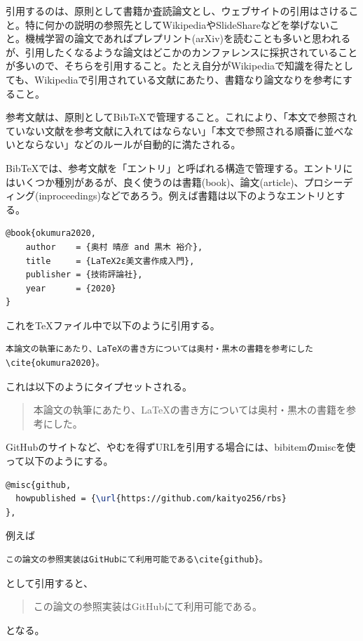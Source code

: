 \documentclass[titlepage]{jsreport}
\begin{document}
引用するのは、原則として書籍か査読論文とし、ウェブサイトの引用はさけること。特に何かの説明の参照先としてWikipediaやSlideShareなどを挙げないこと。機械学習の論文であればプレプリント(arXiv)を読むことも多いと思われるが、引用したくなるような論文はどこかのカンファレンスに採択されていることが多いので、そちらを引用すること。たとえ自分がWikipediaで知識を得たとしても、Wikipediaで引用されている文献にあたり、書籍なり論文なりを参考にすること。

参考文献は、原則としてBibTeXで管理すること。これにより、「本文で参照されていない文献を参考文献に入れてはならない」「本文で参照される順番に並べないとならない」などのルールが自動的に満たされる。

BibTeXでは、参考文献を「エントリ」と呼ばれる構造で管理する。エントリにはいくつか種別があるが、良く使うのは書籍(book)、論文(article)、プロシーディング(inproceedings)などであろう。例えば書籍は以下のようなエントリとする。

\begin{lstlisting}[language=TeX]
@book{okumura2020,
    author    = {奥村 晴彦 and 黒木 裕介},
    title     = {LaTeX2ε美文書作成入門},
    publisher = {技術評論社},
    year      = {2020}
}
\end{lstlisting}

これをTeXファイル中で以下のように引用する。

\begin{verbatim}
本論文の執筆にあたり、LaTeXの書き方については奥村・黒木の書籍を参考にした\cite{okumura2020}。
\end{verbatim}

これは以下のようにタイプセットされる。
\begin{quotation}
    本論文の執筆にあたり、LaTeXの書き方については奥村・黒木の書籍を参考にした\cite{okumura2020}。
\end{quotation}


GitHubのサイトなど、やむを得ずURLを引用する場合には、bibitemのmiscを使って以下のようにする。

\begin{lstlisting}[language=TeX]
@misc{github,
  howpublished = {\url{https://github.com/kaityo256/rbs}
},
\end{lstlisting}

例えば

\begin{verbatim}
この論文の参照実装はGitHubにて利用可能である\cite{github}。
\end{verbatim}
として引用すると、

\begin{quotation}
    この論文の参照実装はGitHubにて利用可能である\cite{github}。
\end{quotation}
となる。
\end{document}
